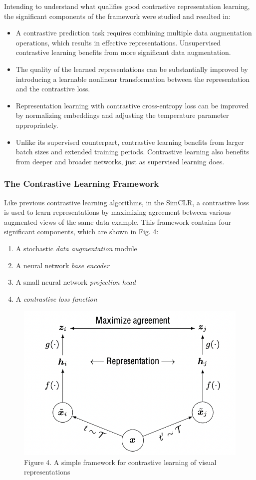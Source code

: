 \documentclass[
]{krantz}
\providecommand{\tightlist}{%
  \setlength{\itemsep}{0pt}\setlength{\parskip}{0pt}}
\begin{document}
Intending to understand what qualifies good contrastive representation learning, the significant components of the framework were studied and resulted in:

\begin{itemize}
\tightlist
\item
  A contrastive prediction task requires combining multiple data augmentation operations, which results in effective representations. Unsupervised contrastive learning benefits from more significant data augmentation.
\item
  The quality of the learned representations can be substantially improved by introducing a learnable nonlinear transformation between the representation and the contrastive loss.
\item
  Representation learning with contrastive cross-entropy loss can be improved by normalizing embeddings and adjusting the temperature parameter appropriately.
\item
  Unlike its supervised counterpart, contrastive learning benefits from larger batch sizes and extended training periods. Contrastive learning also benefits from deeper and broader networks, just as supervised learning does.
\end{itemize}

\hypertarget{the-contrastive-learning-framework}{%
\subsubsection{The Contrastive Learning Framework}\label{the-contrastive-learning-framework}}

Like previous contrastive learning algorithms, in the SimCLR, a contrastive loss is used to learn representations by maximizing agreement between various augmented views of the same data example. This framework contains four significant components, which are shown in Fig. 4:

\begin{enumerate}
\def\labelenumi{\arabic{enumi}.}
\item
  A stochastic \emph{data augmentation} module
\item
  A neural network \emph{base encoder}
\item
  A small neural network \emph{projection head}
\item
  A \emph{contrastive loss function}
\end{enumerate}

\begin{figure}

{\centering \includegraphics[width=0.3\linewidth]{./figures/01-chapter1/SimCLR} 

}

\caption{Figure 4. A simple framework for contrastive learning of visual representations}\label{fig:ch01-figure04}
\end{figure}
\end{document}
